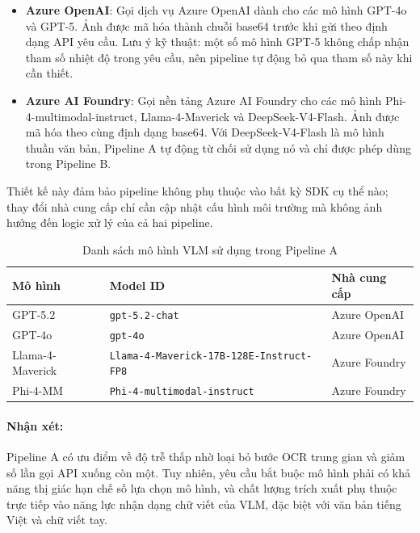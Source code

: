 ﻿\documentclass[12pt]{report}
\begin{document}
\begin{itemize}
    \item \textbf{Azure OpenAI}\footnotemark: Gọi dịch vụ Azure OpenAI dành cho các mô hình GPT-4o và GPT-5. Ảnh được mã hóa thành chuỗi base64 trước khi gửi theo định dạng API yêu cầu. Lưu ý kỹ thuật: một số mô hình GPT-5 không chấp nhận tham số nhiệt độ trong yêu cầu, nên pipeline tự động bỏ qua tham số này khi cần thiết.

    \item \textbf{Azure AI Foundry}\footnotemark: Gọi nền tảng Azure AI Foundry cho các mô hình Phi-4-multimodal-instruct, Llama-4-Maverick và DeepSeek-V4-Flash. Ảnh được mã hóa theo cùng định dạng base64. Với DeepSeek-V4-Flash là mô hình thuần văn bản, Pipeline A tự động từ chối sử dụng nó và chỉ được phép dùng trong Pipeline B.
\end{itemize}

Thiết kế này đảm bảo pipeline không phụ thuộc vào bất kỳ SDK cụ thể nào; thay đổi nhà cung cấp chỉ cần cập nhật cấu hình môi trường mà không ảnh hưởng đến logic xử lý của cả hai pipeline.

\begin{table}[h]
\centering
\caption{Danh sách mô hình VLM sử dụng trong Pipeline A}
\label{tab:models_pipeline_a}
\begin{tabular}{|l|l|l|}
\hline
\textbf{Mô hình} & \textbf{Model ID} & \textbf{Nhà cung cấp} \\ \hline
GPT-5.2          & \texttt{gpt-5.2-chat}                             & Azure OpenAI  \\ \hline
GPT-4o           & \texttt{gpt-4o}                                   & Azure OpenAI  \\ \hline
Llama-4-Maverick & \texttt{Llama-4-Maverick-17B-128E-Instruct-FP8}   & Azure Foundry \\ \hline
Phi-4-MM         & \texttt{Phi-4-multimodal-instruct}                & Azure Foundry \\ \hline
\end{tabular}
\end{table}

\paragraph{Nhận xét:}
Pipeline A có ưu điểm về độ trễ thấp nhờ loại bỏ bước OCR trung gian và giảm số lần gọi API xuống còn một. Tuy nhiên, yêu cầu bắt buộc mô hình phải có khả năng thị giác hạn chế số lựa chọn mô hình, và chất lượng trích xuất phụ thuộc trực tiếp vào năng lực nhận dạng chữ viết của VLM, đặc biệt với văn bản tiếng Việt và chữ viết tay.
\end{document}
